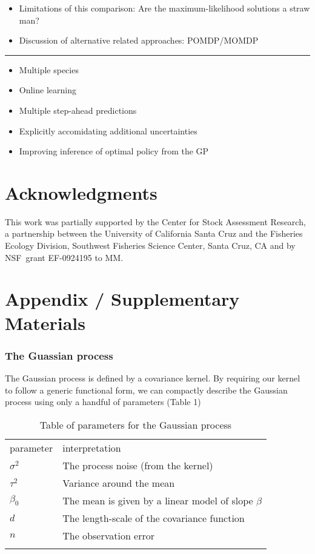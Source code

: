 \documentclass[author-year, review]{elsarticle} %
\begin{document}
\begin{itemize}
\item
  Limitations of this comparison: Are the maximum-likelihood solutions a
  straw man?
\item
  Discussion of alternative related approaches: POMDP/MOMDP 
\end{itemize}

\begin{center}\rule{3in}{0.4pt}\end{center}

\begin{itemize}
\itemsep1pt\parskip0pt
\item
  Multiple species
\item
  Online learning
\item
  Multiple step-ahead predictions
\item
  Explicitly accomidating additional uncertainties
\item
  Improving inference of optimal policy from the GP
\end{itemize}

\section{Acknowledgments}

This work was partially supported by the Center for Stock Assessment
Research, a partnership between the University of California Santa Cruz
and the Fisheries Ecology Division, Southwest Fisheries Science Center,
Santa Cruz, CA and by NSF~grant EF-0924195 to MM.

\section{Appendix / Supplementary Materials}

\subsubsection{The Guassian process}

The Gaussian process is defined by a covariance kernel. By requiring our
kernel to follow a generic functional form, we can compactly describe
the Gaussian process using only a handful of parameters (Table 1)

\begin{longtable}[c]{@{}ll@{}}
\hline\noalign{\medskip}
parameter & interpretation
\\\noalign{\medskip}
\hline\noalign{\medskip}
$\sigma^2$ & The process noise (from the kernel)
\\\noalign{\medskip}
$\tau^2$ & Variance around the mean
\\\noalign{\medskip}
$\beta_0$ & The mean is given by a linear model of slope $\beta$
\\\noalign{\medskip}
$d$ & The length-scale of the covariance function
\\\noalign{\medskip}
$n$ & The observation error
\\\noalign{\medskip}
\hline
\noalign{\medskip}
\caption{Table of parameters for the Gaussian process}
\end{longtable}
\end{document}
